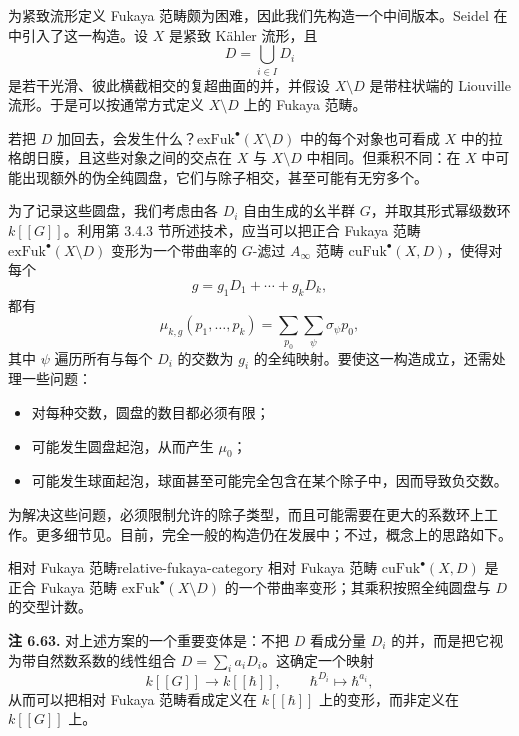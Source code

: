 为紧致流形定义 Fukaya 范畴颇为困难，因此我们先构造一个中间版本。Seidel 在中引入了这一构造。设 $X$ 是紧致 Kähler 流形，且
\[
  D=\bigcup_{i\in I}D_i
\]
是若干光滑、彼此横截相交的复超曲面的并，并假设 $X\setminus D$ 是带柱状端的 Liouville 流形。于是可以按通常方式定义 $X\setminus D$ 上的 Fukaya 范畴。

若把 $D$ 加回去，会发生什么？$\mathrm{exFuk}^\bullet(X\setminus D)$ 中的每个对象也可看成 $X$ 中的拉格朗日膜，且这些对象之间的交点在 $X$ 与 $X\setminus D$ 中相同。但乘积不同：在 $X$ 中可能出现额外的伪全纯圆盘，它们与除子相交，甚至可能有无穷多个。

为了记录这些圆盘，我们考虑由各 $D_i$ 自由生成的幺半群 $G$，并取其形式幂级数环 $k[[G]]$。利用第 3.4.3 节所述技术，应当可以把正合 Fukaya 范畴 $\mathrm{exFuk}^\bullet(X\setminus D)$ 变形为一个带曲率的 $G$-滤过 $A_\infty$ 范畴 $\mathrm{cuFuk}^\bullet(X,D)$，使得对每个
\[
  g=g_1D_1+\cdots+g_kD_k,
\]
都有
\[
  \mu_{k,g}(p_1,\ldots,p_k)=\sum_{p_0}\sum_\psi\sigma_\psi p_0,
\]
其中 $\psi$ 遍历所有与每个 $D_i$ 的交数为 $g_i$ 的全纯映射。要使这一构造成立，还需处理一些问题：
\begin{itemize}
  \item 对每种交数，圆盘的数目都必须有限；
  \item 可能发生圆盘起泡，从而产生 $\mu_0$；
  \item 可能发生球面起泡，球面甚至可能完全包含在某个除子中，因而导致负交数。
\end{itemize}
为解决这些问题，必须限制允许的除子类型，而且可能需要在更大的系数环上工作。更多细节见。目前，完全一般的构造仍在发展中；不过，概念上的思路如下。

\begin{definition}{相对 Fukaya 范畴}{relative-fukaya-category}
相对 Fukaya 范畴 $\mathrm{cuFuk}^\bullet(X,D)$ 是正合 Fukaya 范畴 $\mathrm{exFuk}^\bullet(X\setminus D)$ 的一个带曲率变形；其乘积按照全纯圆盘与 $D$ 的交型计数。
\end{definition}

\begin{note}\label{note:relative-fukaya-parameter}
\textbf{注 6.63.} 对上述方案的一个重要变体是：不把 $D$ 看成分量 $D_i$ 的并，而是把它视为带自然数系数的线性组合 $D=\sum_i a_iD_i$。这确定一个映射
\[
  k[[G]]\to k[[\hbar]],\qquad
  \hbar^{D_i}\longmapsto\hbar^{a_i},
\]
从而可以把相对 Fukaya 范畴看成定义在 $k[[\hbar]]$ 上的变形，而非定义在 $k[[G]]$ 上。
\end{note}

